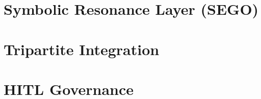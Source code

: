 \documentclass[11pt]{book}
\begin{document}
\part{Symbolic Resonance Layer (SEGO)}









\part{Tripartite Integration}






\part{HITL Governance}










\end{document}
